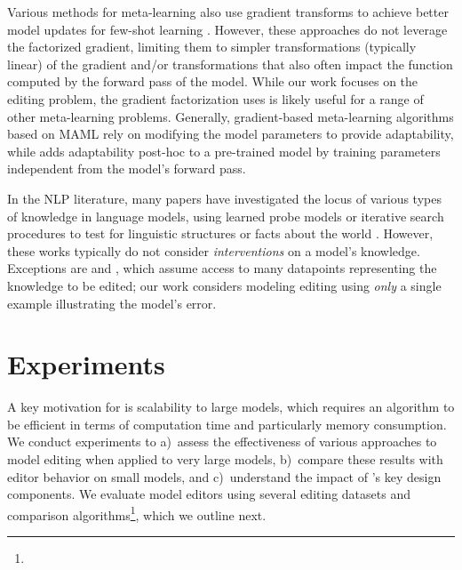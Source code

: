 \documentclass{article}
\begin{document}
Various methods for meta-learning also use gradient transforms to achieve better model updates for few-shot learning \citep{Ravi2017OptimizationAA,li2017metasgd,lee2018gradient,park2019meta,Flennerhag2020Meta-Learning}. However, these approaches do not leverage the factorized gradient, limiting them to simpler transformations (typically linear) of the gradient and/or transformations that also often impact the function computed by the forward pass of the model. While our work focuses on the editing problem, the gradient factorization {\name} uses is likely useful for a range of other meta-learning problems. Generally, gradient-based meta-learning algorithms based on MAML \citep{finn2017maml,lee2018gradient,park2019meta,Flennerhag2020Meta-Learning} rely on modifying the model parameters to provide adaptability, while {\name} adds adaptability post-hoc to a pre-trained model by training parameters independent from the model's forward pass.

In the NLP literature, many papers have investigated the locus of various types of knowledge in language models, using learned probe models or iterative search procedures to test for linguistic structures \citep{belinkov-etal-2017-neural,conneau-etal-2018-cram,hewitt-manning-2019-structural} or facts about the world \citep{petroni-etal-2019-language,Jiang2020HowCW,dai2021knowledge}. However, these works typically do not consider \textit{interventions} on a model's knowledge. Exceptions are \citet{dai2021knowledge} and \citet{wang2020kadapter}, which assume access to many datapoints representing the knowledge to be edited; our work considers modeling editing using \textit{only} a single example illustrating the model's error.

\section{Experiments}



A key motivation for {\name} is scalability to large models, which requires an algorithm to be efficient in terms of computation time and particularly memory consumption. We conduct experiments to a)~assess the effectiveness of various approaches to model editing when applied to very large models, b)~compare these results with editor behavior on small models, and c)~understand the impact of \name's key design components. We evaluate model editors using several editing datasets and comparison algorithms\footnote{}, which we outline next.
\end{document}

